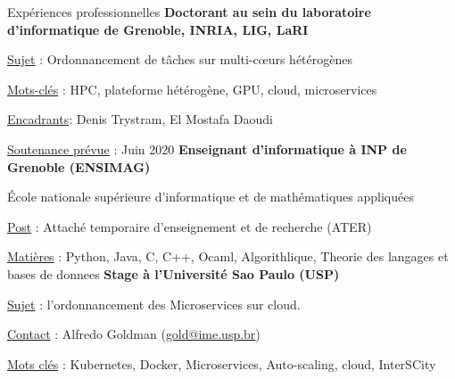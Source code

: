 \begin{rubric}{Expériences professionnelles}
%
%
%
\entry*[]
    \textbf{Doctorant au sein du laboratoire d'informatique de Grenoble, INRIA, LIG, LaRI}
    \hfill {} 
    \par \underline{Sujet} : Ordonnancement de tâches sur multi-cœurs hétérogènes
    \hfill {}
    \par \underline{Mots-clés} : HPC, plateforme hétérogène, GPU, cloud, microservices 
        \hfill {}
    \par \underline{Encadrants}: Denis Trystram, El Mostafa Daoudi
    \par \underline{Soutenance prévue} : Juin 2020
%
%
\entry*[]
    \textbf{Enseignant d'informatique à INP de Grenoble (ENSIMAG)} 
     \hfill {} 
    \par École nationale supérieure d'informatique et de mathématiques appliquées 
    \hfill {}
    \par \underline{Post} : Attaché temporaire d'enseignement et de recherche (ATER)
    \hfill {}
    \par \underline{Matières} : Python, Java, C, C++, Ocaml, Algorithlique, Theorie des langages et bases de donnees%
\entry*[]
    \textbf{Stage à l'Université Sao Paulo (USP)} %
     \hfill{} 
    \par \underline{Sujet} : l'ordonnancement des Microservices sur cloud.
    \hfill {}
    \par \underline{Contact} : Alfredo Goldman (\href{mailto:gold@ime.usp.br}{gold@ime.usp.br})
   \hfill {}
	\par \underline{Mots clés} : Kubernetes, Docker, Microservices, Auto-scaling, cloud, InterSCity

\end{rubric}
